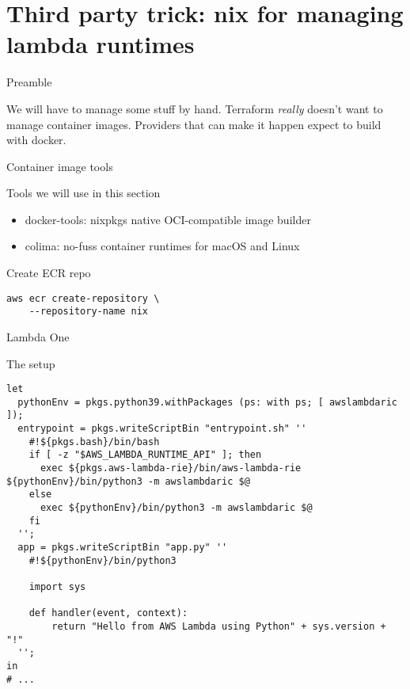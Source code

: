 \documentclass[bigger]{beamer}
\begin{document}
\section{Third party trick: nix for managing lambda runtimes}
\label{sec:org4de27b5}
\begin{frame}[label={sec:orgcf2e7fc}]{Preamble}
\begin{alertblock}{We will have to manage some stuff by hand.}
Terraform \emph{really} doesn't want to manage container images.
Providers that can make it happen expect to build with docker.
\end{alertblock}
\end{frame}
\begin{frame}[label={sec:orgb6c00dd},fragile]{Container image tools}
 \begin{alertblock}{Tools we will use in this section}
\begin{itemize}
\item docker-tools: nixpkgs native OCI-compatible image builder
\item colima: no-fuss container runtimes for macOS and Linux
\end{itemize}
\end{alertblock}
\begin{exampleblock}{Create ECR repo}
\begin{verbatim}
aws ecr create-repository \
    --repository-name nix
\end{verbatim}
\end{exampleblock}
\end{frame}
\begin{frame}[label={sec:orgf7a896f},fragile]{Lambda One}
 \begin{block}{The setup}
\tiny
\begin{verbatim}
let
  pythonEnv = pkgs.python39.withPackages (ps: with ps; [ awslambdaric ]);
  entrypoint = pkgs.writeScriptBin "entrypoint.sh" ''
    #!${pkgs.bash}/bin/bash
    if [ -z "$AWS_LAMBDA_RUNTIME_API" ]; then
      exec ${pkgs.aws-lambda-rie}/bin/aws-lambda-rie ${pythonEnv}/bin/python3 -m awslambdaric $@
    else
      exec ${pythonEnv}/bin/python3 -m awslambdaric $@
    fi
  '';
  app = pkgs.writeScriptBin "app.py" ''
    #!${pythonEnv}/bin/python3

    import sys

    def handler(event, context):
        return "Hello from AWS Lambda using Python" + sys.version + "!"
  '';
in
# ...
\end{verbatim}
\end{block}
\end{frame}
\end{document}
